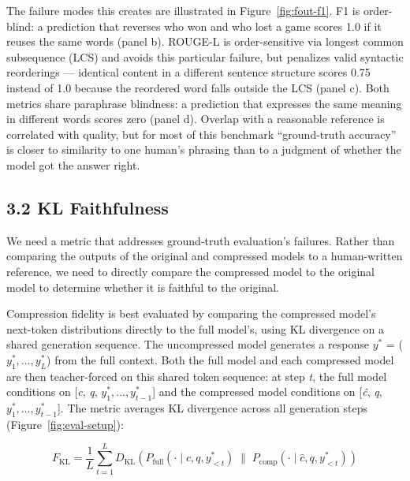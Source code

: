 \documentclass[10pt,letterpaper]{article}
\begin{document}
\begin{itemize}
  The failure modes this creates are illustrated in
  Figure~\ref{fig:fout-f1}. F1 is order-blind: a prediction that
  reverses who won and who lost a game scores 1.0 if it reuses the same
  words (panel b). ROUGE-L is order-sensitive via longest common
  subsequence (LCS) and avoids this particular failure, but penalizes valid
  syntactic reorderings --- identical content in a different sentence
  structure scores 0.75 instead of 1.0 because the reordered word falls
  outside the LCS (panel c). Both metrics share paraphrase blindness: a
  prediction that expresses the same meaning in different words scores
  zero (panel d). Overlap with a reasonable reference is correlated with
  quality, but for most of this benchmark ``ground-truth accuracy'' is
  closer to similarity to one human's phrasing than to a judgment of
  whether the model got the answer right.

\end{itemize}


\hypertarget{kl-faithfulness}{%
\subsection{3.2 KL Faithfulness}\label{kl-faithfulness}}

We need a metric that addresses ground-truth evaluation's failures. Rather than comparing
the outputs of the original and compressed models to a human-written reference,
we need to directly compare the compressed model to the original model to determine
whether it is faithful to the original.

Compression fidelity is best evaluated by comparing the compressed model's next-token
distributions directly to the full model's, using KL divergence on a shared
generation sequence. The uncompressed model generates a response \(y^*\)
= (\(y^*_1, \ldots, y^*_L\)) from the full context. Both the full model
and each compressed model are then teacher-forced on this shared token
sequence: at step \emph{t}, the full model conditions on {[}\emph{c},
\emph{q}, \(y^*_1, \ldots, y^*_{t-1}\){]} and the compressed model
conditions on {[}\emph{ĉ}, \emph{q}, \(y^*_1, \ldots, y^*_{t-1}\){]}.
The metric averages KL divergence across all generation steps
(Figure~\ref{fig:eval-setup}):

\[
F_{\text{KL}} = \frac{1}{L} \sum_{t=1}^{L}
  D_{\text{KL}}\!\left(
    P_{\text{full}}(\cdot \mid c, q, y^*_{<t})
    \;\bigg\|\;
    P_{\text{comp}}(\cdot \mid \hat{c}, q, y^*_{<t})
  \right)
\]
\end{document}
